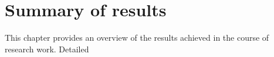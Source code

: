 \chapter{Summary of results}

This chapter provides an overview of the results achieved in the course of research work. 
Detailed 
%



%











